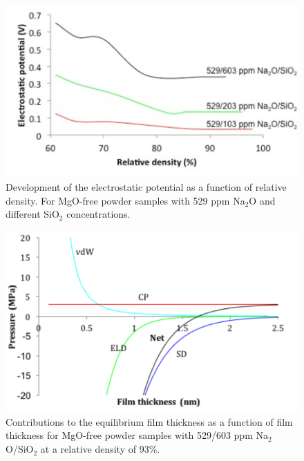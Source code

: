 \newpage
\begin{figure}[H]
	\centering
	\includegraphics[width=\textwidth]{Chapter-4/Figures/Figure6.png}
	\caption{Development of the electrostatic potential as a function of relative density. For MgO-free powder samples with 529 ppm Na$_{2}$O and different SiO$_{2}$ concentrations.}
	\label{Ch4-figure:Figure6}
\end{figure}

\newpage
\begin{figure}[H]
	\centering
	\includegraphics[width=\textwidth]{Chapter-4/Figures/Figure7.png}
	\caption{Contributions to the equilibrium film thickness as a function of film thickness for MgO-free powder samples with 529/603 ppm Na$_{2}$O/SiO$_{2}$ at a relative density of 93\%.}
	\label{Ch4-figure:Figure7}
\end{figure}

